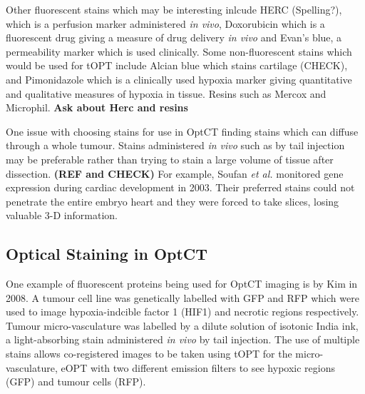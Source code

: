 \documentclass[12pt]{article}
\begin{document}
Other fluorescent stains which may be interesting inlcude HERC (Spelling?), which is a perfusion marker administered \textit{in vivo}, Doxorubicin which is a fluorescent drug  giving a measure of drug delivery \textit{in vivo} and Evan's blue, a permeability marker which is used clinically. 
Some non-fluorescent stains which would be used for tOPT include Alcian blue which stains cartilage (CHECK), and Pimonidazole which is a clinically used hypoxia marker giving quantitative and qualitative measures of hypoxia in tissue. \cite{Varia:1998} Resins such as Mercox and Microphil.
\textbf{Ask about Herc and resins}

One issue with choosing stains for use in OptCT finding stains which can diffuse through a whole tumour. Stains administered \textit{in vivo} such as by tail injection may be preferable rather than trying to stain a large volume of tissue after dissection. \textbf{(REF and CHECK)} For example, Soufan \textit{et al.} monitored gene expression during cardiac development in 2003. Their preferred stains  could not penetrate the entire embryo heart and they were forced to take slices, losing valuable 3-D information. \cite{Soufan:2003cd} 


\subsection{Optical Staining in OptCT}

One example of fluorescent proteins being used for OptCT imaging is by Kim in 2008. \cite{Kim:2008eua} A tumour cell line was genetically labelled with GFP and RFP which were used to image hypoxia-indcible factor 1 (HIF1) and necrotic regions respectively. Tumour micro-vasculature was labelled by a dilute solution of isotonic India ink, a light-absorbing stain administered \textit{in vivo} by tail injection. The use of multiple stains allows co-registered images to be taken using tOPT for the micro-vasculature, eOPT with two different emission filters to see hypoxic regions (GFP) and tumour cells (RFP). 




\end{document}
